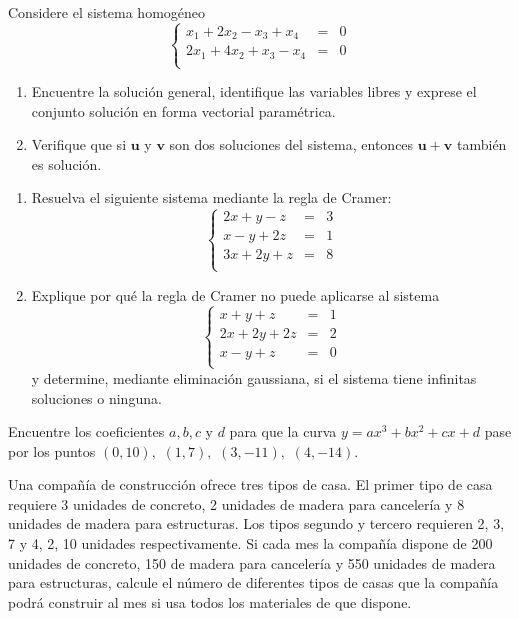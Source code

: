 \begin{prob} Considere el sistema homogéneo
\[
\left\lbrace \begin{array}{ccc}
x_1+2x_2-x_3+x_4&=&0\\
2x_1+4x_2+x_3-x_4&=&0\\
\end{array} \right.
\]
\begin{enumerate}[$a)$]
\item Encuentre la solución general, identifique las variables libres y exprese el conjunto solución en forma vectorial paramétrica.
\item Verifique que si $\mathbf{u}$ y $\mathbf{v}$ son dos soluciones del sistema, entonces $\mathbf{u}+\mathbf{v}$ también es solución.
\end{enumerate}
\end{prob}

\begin{prob}
\begin{enumerate}[$a)$]
\item Resuelva el siguiente sistema mediante la regla de Cramer:
\[
\left\lbrace \begin{array}{ccc}
2x+y-z&=&3\\
x-y+2z&=&1\\
3x+2y+z&=&8\\
\end{array} \right.
\]
\item Explique por qué la regla de Cramer no puede aplicarse al sistema
\[
\left\lbrace \begin{array}{ccc}
x+y+z&=&1\\
2x+2y+2z&=&2\\
x-y+z&=&0\\
\end{array} \right.
\]
y determine, mediante eliminación gaussiana, si el sistema tiene infinitas soluciones o ninguna.
\end{enumerate}
\end{prob}

\begin{prob} Encuentre los coeficientes $a, b, c$ y $d$ para que la curva $y=ax^3+bx^2+cx+d$ pase por los puntos $(0,10),$ $(1,7),$ $(3,-11),$ $(4,-14)$.\end{prob}

\begin{prob}Una compañía de construcción ofrece tres tipos de casa. El primer tipo de casa requiere 3 unidades de concreto, 2 unidades de madera para cancelería y 8 unidades de madera para estructuras. Los tipos segundo y tercero requieren 2, 3, 7 y 4, 2, 10 unidades respectivamente. Si cada mes la compañía dispone de 200 unidades de concreto, 150 de madera para cancelería y 550 unidades de madera para estructuras, calcule el número de diferentes tipos de casas que la compañía podrá construir al mes si usa todos los materiales de que dispone.
\end{prob}


